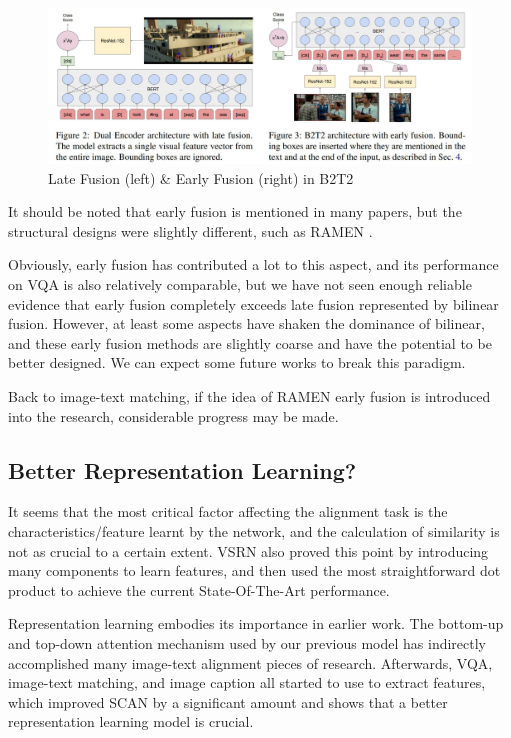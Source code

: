 \begin{figure}[h!]
\centering
\includegraphics[width=\textwidth]{fusion.pdf}
\caption{Late Fusion (left) \& Early Fusion (right) in B2T2 \cite{B2T2}}
\label{fig:fusionb2t2}
\end{figure}

It should be noted that early fusion is mentioned in many papers, but the structural designs were slightly different, such as RAMEN \cite{ramen}.

Obviously, early fusion has contributed a lot to this aspect, and its performance on VQA is also relatively comparable, but we have not seen enough reliable evidence that early fusion completely exceeds late fusion represented by bilinear fusion. However, at least some aspects have shaken the dominance of bilinear, and these early fusion methods are slightly coarse and have the potential to be better designed. We can expect some future works to break this paradigm.

Back to image-text matching, if the idea of RAMEN \cite{ramen} early fusion is introduced into the research, considerable progress may be made.

\subsection{Better Representation Learning?}

It seems that the most critical factor affecting the alignment task is the characteristics/feature learnt by the network, and the calculation of similarity is not as crucial to a certain extent. VSRN \cite{VSRN} also proved this point by introducing many components to learn features, and then used the most straightforward dot product to achieve the current State-Of-The-Art performance.

Representation learning embodies its importance in earlier work. The bottom-up and top-down \cite{bottomup} attention mechanism used by our previous model has indirectly accomplished many image-text alignment pieces of research. Afterwards, VQA, image-text matching, and image caption all started to use \cite{bottomup} to extract features, which improved SCAN \cite{scan} by a significant amount and shows that a better representation learning model is crucial.

